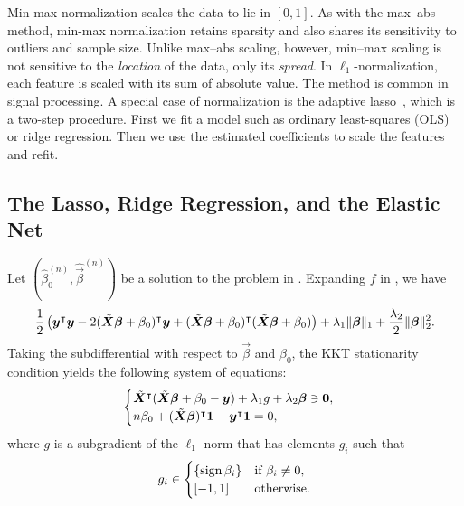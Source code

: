 Min-max normalization scales the data to lie in \([0, 1]\). As with the max--abs method,
min-max normalization retains sparsity and also shares its sensitivity to outliers and
sample size. Unlike max--abs scaling, however, min--max scaling is not sensitive to the
\emph{location} of the data, only its \emph{spread}. In \(\ell_1\)-normalization, each
feature is scaled with its sum of absolute value. The method is common in signal
processing. A special case of normalization is the adaptive lasso~\citep{zou2006}, which is
a two-step procedure. First we fit a model such as ordinary least-squares (OLS) or ridge
regression. Then we use the estimated coefficients to scale the features and refit.

\subsection{The Lasso, Ridge Regression, and the Elastic Net}

Let \((\hat{\beta}_0^{(n)}, \hat{\vec{\beta}}^{(n)})\) be a solution to the problem in
. Expanding \(f\) in , we have
\[
  \begin{aligned}
    \frac{1}{2}\left( \boldsymbol y^\intercal \boldsymbol y - 2(\tilde{\boldsymbol{X}}\boldsymbol{\beta} + \beta_0)^\intercal\boldsymbol{y} + (\tilde{\boldsymbol{X}}\boldsymbol{\beta} + \beta_0)^\intercal(\tilde{\boldsymbol{X}}\boldsymbol{\beta} + \beta_0)\right) + \lambda_1 \lVert \boldsymbol\beta \rVert_1 + \frac{\lambda_2}{2}\lVert \boldsymbol \beta \rVert_2^2.
  \end{aligned}
\]
Taking the subdifferential with respect to \(\vec{\beta}\) and \(\beta_0\), the KKT
stationarity condition yields the following system of equations:
\begin{equation}
  \label{eq:kkt-elasticnet}
  \begin{cases}
    \tilde{\boldsymbol{X}}^\intercal(\tilde{\boldsymbol{X}}\boldsymbol{\beta} + \beta_0 - \boldsymbol{y}) + \lambda_1 g + \lambda_2 \boldsymbol\beta \ni \boldsymbol{0}, \\
    n \beta_0 + (\tilde{\boldsymbol{X}}\boldsymbol{\beta})^\intercal \boldsymbol{1} - \boldsymbol{y}^\intercal \boldsymbol{1} = 0,
  \end{cases}
\end{equation}
where \(g\) is a subgradient of the \(\ell_1\) norm that has elements \(g_i\) such that
\[
  g_i \in
  \begin{cases}
    \{\operatorname{sign}{\beta_i}\} & \text{if } \beta_i \neq 0, \\
    [-1, 1]            & \text{otherwise}.
  \end{cases}
\]

